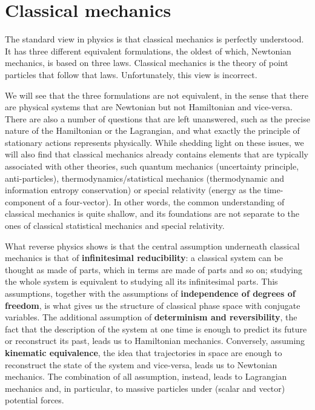 \chapter{Classical mechanics}

The standard view in physics is that classical mechanics is perfectly understood. It has three different equivalent formulations, the oldest of which, Newtonian mechanics, is based on three laws. Classical mechanics is the theory of point particles that follow that laws. Unfortunately, this view is incorrect.

We will see that the three formulations are not equivalent, in the sense that there are physical systems that are Newtonian but not Hamiltonian and vice-versa. There are also a number of questions that are left unanswered, such as the precise nature of the Hamiltonian or the Lagrangian, and what exactly the principle of stationary actions represents physically. While shedding light on these issues, we will also find that classical mechanics already contains elements that are typically associated with other theories, such quantum mechanics (uncertainty principle, anti-particles), thermodynamics/statistical mechanics (thermodynamic and information entropy conservation) or special relativity (energy as the time-component of a four-vector). In other words, the common understanding of classical mechanics is quite shallow, and its foundations are not separate to the ones of classical statistical mechanics and special relativity.

What reverse physics shows is that the central assumption underneath classical mechanics is that of \textbf{infinitesimal reducibility}: a classical system can be thought as made of parts, which in terms are made of parts and so on; studying the whole system is equivalent to studying all its infinitesimal parts. This assumptions, together with the assumptions of \textbf{independence of degrees of freedom}, is what gives us the structure of classical phase space with conjugate variables. The additional assumption of \textbf{determinism and reversibility}, the fact that the description of the system at one time is enough to predict its future or reconstruct its past, leads us to Hamiltonian mechanics. Conversely, assuming \textbf{kinematic equivalence}, the idea that trajectories in space are enough to reconstruct the state of the system and vice-versa, leads us to Newtonian mechanics. The combination of all assumption, instead, leads to Lagrangian mechanics and, in particular, to massive particles under (scalar and vector) potential forces.


